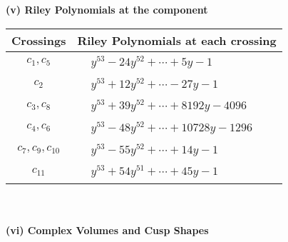 \documentclass[1p]{elsarticle_modified}
\theoremstyle{definition}
\begin{document}
\newpage\renewcommand{\arraystretch}{1}
\flushleft \textbf{(v) Riley Polynomials at the component}\newline \\
\begin{tabular}{m{50pt}|m{274pt}}
Crossings & \hspace{64pt}Riley Polynomials at each crossing \\
\hline $$\begin{aligned}c_{1},c_{5}\end{aligned}$$&$\begin{aligned}
&y^{53}-24 y^{52}+\cdots+5 y-1
\end{aligned}$\\
\hline $$\begin{aligned}c_{2}\end{aligned}$$&$\begin{aligned}
&y^{53}+12 y^{52}+\cdots-27 y-1
\end{aligned}$\\
\hline $$\begin{aligned}c_{3},c_{8}\end{aligned}$$&$\begin{aligned}
&y^{53}+39 y^{52}+\cdots+8192 y-4096
\end{aligned}$\\
\hline $$\begin{aligned}c_{4},c_{6}\end{aligned}$$&$\begin{aligned}
&y^{53}-48 y^{52}+\cdots+10728 y-1296
\end{aligned}$\\
\hline $$\begin{aligned}c_{7},c_{9},c_{10}\end{aligned}$$&$\begin{aligned}
&y^{53}-55 y^{52}+\cdots+14 y-1
\end{aligned}$\\
\hline $$\begin{aligned}c_{11}\end{aligned}$$&$\begin{aligned}
&y^{53}+54 y^{51}+\cdots+45 y-1
\end{aligned}$\\
\hline
\end{tabular}\\~\\
\newpage\flushleft \textbf{(vi) Complex Volumes and Cusp Shapes}
\end{document}
